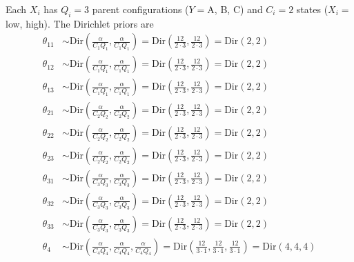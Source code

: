 \documentclass{article}
\begin{document}
Each $X_i$ has $Q_i=3$ parent configurations ($Y=$A, B, C) and $C_i=2$ states ($X_i=$low, high). The Dirichlet priors are \begin{align*}
\theta_{11} &\sim \mathrm{Dir}\left(\frac{\alpha}{C_1 Q_1}, \frac{\alpha}{C_1 Q_1} \right) = \mathrm{Dir}\left(\frac{12}{2 \cdot 3}, \frac{12}{2 \cdot 3} \right) = \mathrm{Dir}(2,2) \\
\theta_{12} &\sim \mathrm{Dir}\left(\frac{\alpha}{C_1 Q_1}, \frac{\alpha}{C_1 Q_1} \right) = \mathrm{Dir}\left(\frac{12}{2 \cdot 3}, \frac{12}{2 \cdot 3} \right) = \mathrm{Dir}(2,2) \\
\theta_{13} &\sim \mathrm{Dir}\left(\frac{\alpha}{C_1 Q_1}, \frac{\alpha}{C_1 Q_1} \right) = \mathrm{Dir}\left(\frac{12}{2 \cdot 3}, \frac{12}{2 \cdot 3} \right) = \mathrm{Dir}(2,2) \\
\theta_{21} &\sim \mathrm{Dir}\left(\frac{\alpha}{C_2 Q_2}, \frac{\alpha}{C_2 Q_2} \right) = \mathrm{Dir}\left(\frac{12}{2 \cdot 3}, \frac{12}{2 \cdot 3} \right) = \mathrm{Dir}(2,2) \\
\theta_{22} &\sim \mathrm{Dir}\left(\frac{\alpha}{C_2 Q_2}, \frac{\alpha}{C_2 Q_2} \right) = \mathrm{Dir}\left(\frac{12}{2 \cdot 3}, \frac{12}{2 \cdot 3} \right) = \mathrm{Dir}(2,2) \\
\theta_{23} &\sim \mathrm{Dir}\left(\frac{\alpha}{C_2 Q_2}, \frac{\alpha}{C_2 Q_2} \right) = \mathrm{Dir}\left(\frac{12}{2 \cdot 3}, \frac{12}{2 \cdot 3} \right) = \mathrm{Dir}(2,2) \\
\theta_{31} &\sim \mathrm{Dir}\left(\frac{\alpha}{C_3 Q_3}, \frac{\alpha}{C_3 Q_3} \right) = \mathrm{Dir}\left(\frac{12}{2 \cdot 3}, \frac{12}{2 \cdot 3} \right) = \mathrm{Dir}(2,2) \\
\theta_{32} &\sim \mathrm{Dir}\left(\frac{\alpha}{C_3 Q_3}, \frac{\alpha}{C_3 Q_3} \right) = \mathrm{Dir}\left(\frac{12}{2 \cdot 3}, \frac{12}{2 \cdot 3} \right) = \mathrm{Dir}(2,2) \\
\theta_{33} &\sim \mathrm{Dir}\left(\frac{\alpha}{C_3 Q_3}, \frac{\alpha}{C_3 Q_3} \right) = \mathrm{Dir}\left(\frac{12}{2 \cdot 3}, \frac{12}{2 \cdot 3} \right) = \mathrm{Dir}(2,2) \\
\theta_4 &\sim \mathrm{Dir}\left(\frac{\alpha}{C_4 Q_4}, \frac{\alpha}{C_4 Q_4}, \frac{\alpha}{C_4 Q_4} \right) = \mathrm{Dir}\left(\frac{12}{3 \cdot 1}, \frac{12}{3 \cdot 1}, \frac{12}{3 \cdot 1} \right) = \mathrm{Dir}(4,4,4)
\end{align*}
\end{document}
